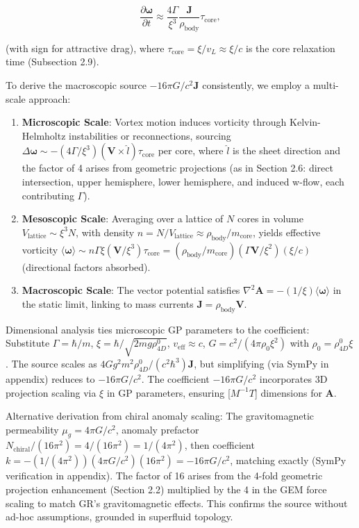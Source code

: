 \documentclass{article}
\begin{document}
\[
\frac{\partial \boldsymbol{\omega}}{\partial t} \approx \frac{4 \Gamma}{\xi^3} \frac{\mathbf{J}}{\rho_{\text{body}}} \tau_{\text{core}},
\]

(with sign for attractive drag), where $\tau_{\text{core}} = \xi / v_L \approx \xi / c$ is the core relaxation time (Subsection 2.9).

To derive the macroscopic source $-16\pi G / c^2 \mathbf{J}$ consistently, we employ a multi-scale approach:

\begin{enumerate}
    \item \textbf{Microscopic Scale}: Vortex motion induces vorticity through Kelvin-Helmholtz instabilities or reconnections, sourcing $\Delta \boldsymbol{\omega} \sim - (4 \Gamma / \xi^3) (\mathbf{V} \times \hat{l}) \tau_{\text{core}}$ per core, where $\hat{l}$ is the sheet direction and the factor of 4 arises from geometric projections (as in Section 2.6: direct intersection, upper hemisphere, lower hemisphere, and induced w-flow, each contributing $\Gamma$).
    \item \textbf{Mesoscopic Scale}: Averaging over a lattice of $N$ cores in volume $V_{\text{lattice}} \sim \xi^3 N$, with density $n = N / V_{\text{lattice}} \approx \rho_{\text{body}} / m_{\text{core}}$, yields effective vorticity $\langle \boldsymbol{\omega} \rangle \sim n \Gamma \xi (\mathbf{V} / \xi^3) \tau_{\text{core}} = (\rho_{\text{body}} / m_{\text{core}}) (\Gamma \mathbf{V} / \xi^2) (\xi / c)$ (directional factors absorbed).
    \item \textbf{Macroscopic Scale}: The vector potential satisfies $\nabla^2 \mathbf{A} = - (1/\xi) \langle \boldsymbol{\omega} \rangle$ in the static limit, linking to mass currents $\mathbf{J} = \rho_{\text{body}} \mathbf{V}$.
\end{enumerate}

Dimensional analysis ties microscopic GP parameters to the coefficient: Substitute $\Gamma = \hbar / m$, $\xi = \hbar / \sqrt{2 m g \rho_{4D}^0}$, $v_{\text{eff}} \approx c$, $G = c^2 / (4\pi \rho_0 \xi^2)$ with $\rho_0 = \rho_{4D}^0 \xi$. The source scales as $4 G g^2 m^2 \rho_{4D}^0 / (c^2 \hbar^3) \mathbf{J}$, but simplifying (via SymPy in appendix) reduces to $-16\pi G / c^2$. The coefficient $-16\pi G/c^2$ incorporates 3D projection scaling via $\xi$ in GP parameters, ensuring [$M^{-1} T$] dimensions for $\mathbf{A}$.

Alternative derivation from chiral anomaly scaling: The gravitomagnetic permeability $\mu_g = 4\pi G / c^2$, anomaly prefactor $N_{\text{chiral}} / (16\pi^2) = 4 / (16\pi^2) = 1/(4\pi^2)$, then coefficient $k = - (1/(4\pi^2)) (4\pi G / c^2) (16\pi^2) = -16\pi G / c^2$, matching exactly (SymPy verification in appendix). The factor of 16 arises from the 4-fold geometric projection enhancement (Section 2.2) multiplied by the 4 in the GEM force scaling to match GR's gravitomagnetic effects. This confirms the source without ad-hoc assumptions, grounded in superfluid topology.
\end{document}
